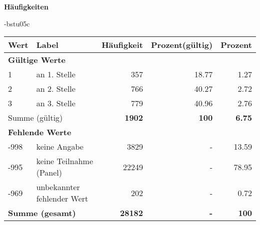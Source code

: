         		\vspace*{0.5cm}
                \noindent\textbf{Häufigkeiten}

                \vspace*{-\baselineskip}
					\begin{filecontents}{\jobname-bstu05c}
					\begin{longtable}{lXrrr}
					\toprule
					\textbf{Wert} & \textbf{Label} & \textbf{Häufigkeit} & \textbf{Prozent(gültig)} & \textbf{Prozent} \\
					\endhead
					\midrule
					\multicolumn{5}{l}{\textbf{Gültige Werte}}\\

					1 &
					\multicolumn{1}{X}{ an 1. Stelle   } &


					  \num{357} &
					  \num[round-mode=places,round-precision=2]{18,77} &
					    \num[round-mode=places,round-precision=2]{1,27} \\

					2 &
					\multicolumn{1}{X}{ an 2. Stelle   } &


					  \num{766} &
					  \num[round-mode=places,round-precision=2]{40,27} &
					    \num[round-mode=places,round-precision=2]{2,72} \\

					3 &
					\multicolumn{1}{X}{ an 3. Stelle   } &


					  \num{779} &
					  \num[round-mode=places,round-precision=2]{40,96} &
					    \num[round-mode=places,round-precision=2]{2,76} \\
					\midrule
					\multicolumn{2}{l}{Summe (gültig)} &
					  \textbf{\num{1902}} &
					\textbf{100} &
					  \textbf{\num[round-mode=places,round-precision=2]{6,75}} \\
					\multicolumn{5}{l}{\textbf{Fehlende Werte}}\\
							-998 &
							keine Angabe &
							  \num{3829} &
							 - &
							  \num[round-mode=places,round-precision=2]{13,59} \\
							-995 &
							keine Teilnahme (Panel) &
							  \num{22249} &
							 - &
							  \num[round-mode=places,round-precision=2]{78,95} \\
							-969 &
							unbekannter fehlender Wert &
							  \num{202} &
							 - &
							  \num[round-mode=places,round-precision=2]{0,72} \\
					\midrule
					\multicolumn{2}{l}{\textbf{Summe (gesamt)}} &
				      \textbf{\num{28182}} &
				    \textbf{-} &
				    \textbf{100} \\
					\bottomrule
					\end{longtable}
					\end{filecontents}
